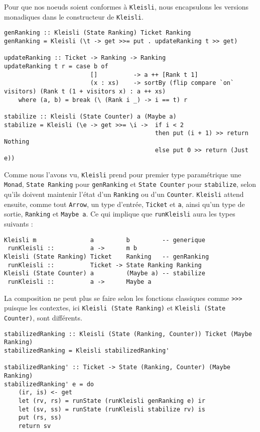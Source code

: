 \documentclass{llncs}
\begin{document}
Pour que nos noeuds soient conformes à \lstinline{Kleisli}, nous encapsulons les
versions monadiques dans le constructeur de \lstinline{Kleisli}.
\begin{lstlisting}
genRanking :: Kleisli (State Ranking) Ticket Ranking
genRanking = Kleisli (\t -> get >>= put . updateRanking t >> get)

updateRanking :: Ticket -> Ranking -> Ranking
updateRanking t r = case b of
                        []          -> a ++ [Rank t 1]
                        (x : xs)    -> sortBy (flip compare `on` visitors) (Rank t (1 + visitors x) : a ++ xs)
    where (a, b) = break (\ (Rank i _) -> i == t) r

stabilize :: Kleisli (State Counter) a (Maybe a)
stabilize = Kleisli (\e -> get >>= \i ->  if i < 2
                                          then put (i + 1) >> return Nothing
                                          else put 0 >> return (Just e))
\end{lstlisting}
Comme nous l'avons vu, \lstinline{Kleisli} prend pour premier type paramétrique
une \lstinline{Monad}, \lstinline{State Ranking} pour \lstinline{genRanking} et
\lstinline{State Counter} pour \lstinline{stabilize}, selon qu'ils doivent
maintenir l'état d'un \lstinline{Ranking} ou d'un \lstinline{Counter}.
\lstinline{Kleisli} attend ensuite, comme tout \lstinline{Arrow}, un type d'entrée,
\lstinline{Ticket} et \lstinline{a}, ainsi qu'un type de sortie, \lstinline{Ranking}
et \lstinline{Maybe a}.
Ce qui implique que \lstinline{runKleisli} aura les types suivants :
\begin{lstlisting}
Kleisli m               a         b         -- generique
 runKleisli ::          a ->      m b
Kleisli (State Ranking) Ticket    Ranking   -- genRanking
 runKleisli ::          Ticket -> State Ranking Ranking
Kleisli (State Counter) a         (Maybe a) -- stabilize
 runKleisli ::          a ->      Maybe a
\end{lstlisting}

La composition ne peut plus se faire selon les fonctions classiques comme \lstinline{>>>}
puisque les contextes, ici \lstinline{Kleisli (State Ranking)} et \lstinline{Kleisli (State Counter)},
sont différents.

\begin{lstlisting}
stabilizedRanking :: Kleisli (State (Ranking, Counter)) Ticket (Maybe Ranking)
stabilizedRanking = Kleisli stabilizedRanking'

stabilizedRanking' :: Ticket -> State (Ranking, Counter) (Maybe Ranking)
stabilizedRanking' e = do
    (ir, is) <- get
    let (rv, rs) = runState (runKleisli genRanking e) ir
    let (sv, ss) = runState (runKleisli stabilize rv) is
    put (rs, ss)
    return sv
\end{lstlisting}
\end{document}
